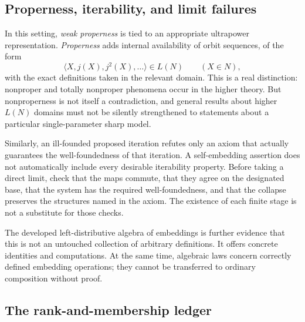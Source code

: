 \documentclass[11pt,letterpaper]{article}
\theoremstyle{definition}
\begin{document}
\subsection{Properness, iterability, and limit failures}

In this setting, \emph{weak properness} is tied to an appropriate ultrapower representation. \emph{Properness} adds internal availability of orbit sequences, of the form
\[
 \langle X,j(X),j^2(X),\ldots\rangle\in L(N)
 \qquad(X\in N),
\]
with the exact definitions taken in the relevant domain. This is a real distinction: nonproper and totally nonproper phenomena occur in the higher theory. But nonproperness is not itself a contradiction, and general results about higher $L(N)$ domains must not be silently strengthened to statements about a particular single-parameter sharp model. \cite{nonproper,ld,dimonte}

Similarly, an ill-founded proposed iteration refutes only an axiom that actually guarantees the well-foundedness of that iteration. A self-embedding assertion does not automatically include every desirable iterability property. Before taking a direct limit, check that the maps commute, that they agree on the designated base, that the system has the required well-foundedness, and that the collapse preserves the structures named in the axiom. The existence of each finite stage is not a substitute for those checks. \cite{iterability,ld}

The developed left-distributive algebra of embeddings is further evidence that this is not an untouched collection of arbitrary definitions. It offers concrete identities and computations. At the same time, algebraic laws concern correctly defined embedding operations; they cannot be transferred to ordinary composition without proof. \cite{ld,dimonte}

\Needspace{205pt}
\subsection{The rank-and-membership ledger}
\end{document}
